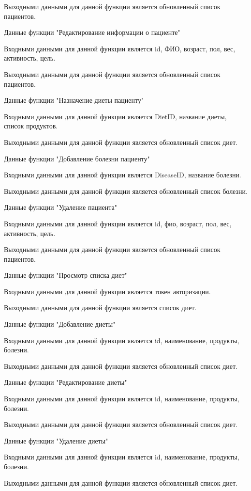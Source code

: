 Выходными данными для данной функции является обновленный список пациентов.

Данные функции "Редактирование информации о пациенте"

Входными данными для данной функции является id, ФИО, возраст, пол, вес, активность, цель.

Выходными данными для данной функции является обновленный список пациентов.

Данные функции "Назначение диеты пациенту"

Входными данными для данной функции является DietID, название диеты, список продуктов.

Выходными данными для данной функции является обновленный список диет.

Данные функции "Добавление болезни пациенту"

Входными данными для данной функции является DiseaseID, название болезни.

Выходными данными для данной функции является обновленный список болезни.

Данные функции "Удаление пациента"

Входными данными для данной функции является id, фио, возраст, пол, вес, активность, цель.

Выходными данными для данной функции является обновленный список пациентов.

Данные функции "Просмотр списка диет"

Входными данными для данной функции является токен авторизации.

Выходными данными для данной функции является список диет.

Данные функции "Добавление диеты"

Входными данными для данной функции является id, наименование, продукты, болезни.

Выходными данными для данной функции является обновленный список диет.

Данные функции "Редактирование диеты"

Входными данными для данной функции является id, наименование, продукты, болезни.

Выходными данными для данной функции является обновленный список диет.

Данные функции "Удаление диеты"

Входными данными для данной функции является id, наименование, продукты, болезни.

Выходными данными для данной функции является обновленный список диет.


